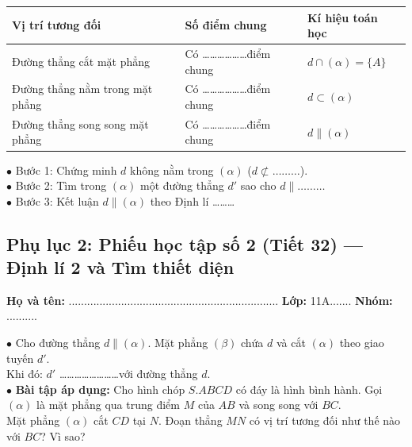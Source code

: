 \documentclass[12pt, a4paper]{article}
\begin{document}
\begin{pedabox}
\begin{center}
\begin{tabularx}{0.95\linewidth}{|p{4.2cm}|X|X|}
\hline
\textbf{Vị trí tương đối} & \textbf{Số điểm chung} & \textbf{Kí hiệu toán học} \\
\hline
Đường thẳng cắt mặt phẳng & Có \dots\dots\dots\dots\dots\dots điểm chung & $d \cap (\alpha) = \{A\}$ \\
\hline
Đường thẳng nằm trong mặt phẳng & Có \dots\dots\dots\dots\dots\dots điểm chung & $d \subset (\alpha)$ \\
\hline
Đường thẳng song song mặt phẳng & Có \dots\dots\dots\dots\dots\dots điểm chung & $d \parallel (\alpha)$ \\
\hline
\end{tabularx}
\end{center}
\end{pedabox}

\begin{pedabox}
$\bullet$ Bước 1: Chứng minh $d$ không nằm trong $(\alpha)$ ($d \not\subset \dots\dots\dots$).\\
$\bullet$ Bước 2: Tìm trong $(\alpha)$ một đường thẳng $d'$ sao cho $d \parallel \dots\dots\dots$\\
$\bullet$ Bước 3: Kết luận $d \parallel (\alpha)$ theo Định lí \dots\dots\dots
\end{pedabox}

\subsection*{Phụ lục 2: Phiếu học tập số 2 (Tiết 32) --- Định lí 2 và Tìm thiết diện}
\noindent\textbf{Họ và tên:} .................................................................... \textbf{Lớp:} 11A....... \textbf{Nhóm:} ..........

\begin{pedabox}
$\bullet$ Cho đường thẳng $d \parallel (\alpha)$. Mặt phẳng $(\beta)$ chứa $d$ và cắt $(\alpha)$ theo giao tuyến $d'$.\\
Khi đó: $d'$ \dots\dots\dots\dots\dots\dots\dots\dots với đường thẳng $d$.\\[0.3em]
$\bullet$ \textbf{Bài tập áp dụng:} Cho hình chóp $S.ABCD$ có đáy là hình bình hành. Gọi $(\alpha)$ là mặt phẳng qua trung điểm $M$ của $AB$ và song song với $BC$.\\
Mặt phẳng $(\alpha)$ cắt $CD$ tại $N$. Đoạn thẳng $MN$ có vị trí tương đối như thế nào với $BC$? Vì sao?
\end{pedabox}
\end{document}
